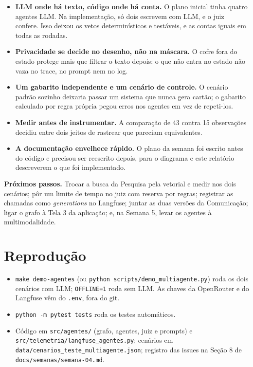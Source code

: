 \documentclass[12pt,a4paper]{article}
\begin{document}
\begin{itemize}
\item \textbf{LLM onde há texto, código onde há conta.} O plano inicial tinha quatro agentes LLM. Na implementação, só dois escrevem com LLM, e o juiz confere. Isso deixou os vetos determinísticos e testáveis, e as contas iguais em todas as rodadas.
\item \textbf{Privacidade se decide no desenho, não na máscara.} O cofre fora do estado protege mais que filtrar o texto depois: o que não entra no estado não vaza no trace, no prompt nem no log.
\item \textbf{Um gabarito independente e um cenário de controle.} O cenário padrão sozinho deixaria passar um sistema que nunca gera cartão; o gabarito calculado por regra própria pegou erros nos agentes em vez de repeti-los.
\item \textbf{Medir antes de instrumentar.} A comparação de 43 contra 15 observações decidiu entre dois jeitos de rastrear que pareciam equivalentes.
\item \textbf{A documentação envelhece rápido.} O plano da semana foi escrito antes do código e precisou ser reescrito depois, para o diagrama e este relatório descreverem o que foi implementado.
\end{itemize}

\textbf{Próximos passos.} Trocar a busca da Pesquisa pela vetorial e medir nos dois cenários; pôr um limite de tempo no juiz com reserva por regras; registrar as chamadas como \textit{generations} no Langfuse; juntar as duas versões da Comunicação; ligar o grafo à Tela 3 da aplicação; e, na Semana 5, levar os agentes à multimodalidade.


\section{Reprodução}
\begin{itemize}
\item \texttt{make demo-agentes} (ou \texttt{python scripts/demo\_\allowbreak{}multiagente.py}) roda os dois cenários com LLM; \texttt{OFFLINE=1} roda sem LLM. As chaves da OpenRouter e do Langfuse vêm do \texttt{.env}, fora do git.
\item \texttt{python -m pytest tests} roda os testes automáticos.
\item Código em \texttt{src/agentes/} (grafo, agentes, juiz e prompts) e \texttt{src/telemetria/langfuse\_\allowbreak{}agentes.py}; cenários em \texttt{data/cenarios\_\allowbreak{}teste\_\allowbreak{}multiagente.json}; registro das issues na Seção 8 de \texttt{docs/semanas/semana-04.md}.
\end{itemize}
\end{document}
